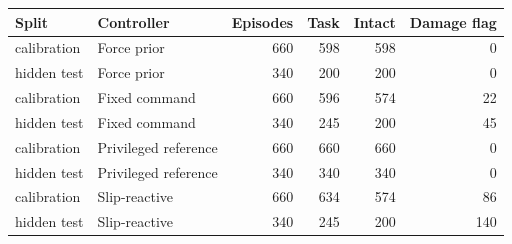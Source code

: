 \begin{tabular}{llrrrr}
\toprule
Split & Controller & Episodes & Task & Intact & Damage flag \\
\midrule
calibration & Force prior & 660 & 598 & 598 & 0 \\
hidden test & Force prior & 340 & 200 & 200 & 0 \\
calibration & Fixed command & 660 & 596 & 574 & 22 \\
hidden test & Fixed command & 340 & 245 & 200 & 45 \\
calibration & Privileged reference & 660 & 660 & 660 & 0 \\
hidden test & Privileged reference & 340 & 340 & 340 & 0 \\
calibration & Slip-reactive & 660 & 634 & 574 & 86 \\
hidden test & Slip-reactive & 340 & 245 & 200 & 140 \\
\bottomrule
\end{tabular}

